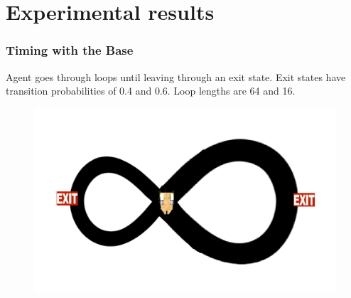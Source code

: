\documentclass{beamer}
\begin{document}

\section{Experimental results}

\begin{frame}
\frametitle{Timing with the Base}
Agent goes through loops until leaving through an exit state. Exit states have transition probabilities of 0.4 and 0.6. Loop lengths are 64 and 16.
\begin{figure}
\includegraphics[width=0.8\linewidth]{lucasplots/monImages/doubleLoopImage.png}
\end{figure}
\end{frame}
\end{document}
